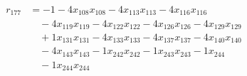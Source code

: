 \[\begin{aligned}
r_{177} &= - 1 - 4 x_{108} x_{108} - 4 x_{113} x_{113} - 4 x_{116} x_{116} \\
 &\quad - 4 x_{119} x_{119} - 4 x_{122} x_{122} - 4 x_{126} x_{126} - 4 x_{129} x_{129} \\
 &\quad + 1 x_{131} x_{131} - 4 x_{133} x_{133} - 4 x_{137} x_{137} - 4 x_{140} x_{140} \\
 &\quad - 4 x_{143} x_{143} - 1 x_{242} x_{242} - 1 x_{243} x_{243} - 1 x_{244} \\
 &\quad - 1 x_{244} x_{244}
\end{aligned}\]
\endgroup
